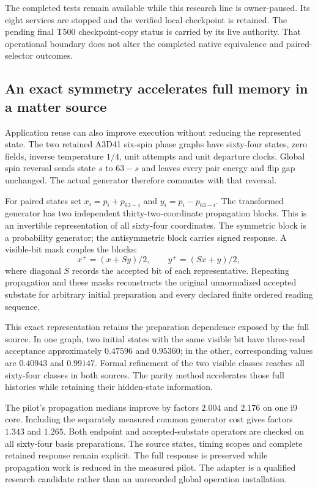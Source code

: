 The completed tests remain available while this research line is owner-paused. Its eight services are stopped and the verified local checkpoint is retained. The pending final T500 checkpoint-copy status is carried by its live authority. That operational boundary does not alter the completed native equivalence and paired-selector outcomes.

\subsection{An exact symmetry accelerates full memory in a matter source}

Application reuse can also improve execution without reducing the represented state. The two retained A3D41 six-spin phase graphs have sixty-four states, zero fields, inverse temperature $1/4$, unit attempts and unit departure clocks. Global spin reversal sends state $s$ to $63-s$ and leaves every pair energy and flip gap unchanged. The actual generator therefore commutes with that reversal. 

For paired states set $x_i=p_i+p_{63-i}$ and $y_i=p_i-p_{63-i}$. The transformed generator has two independent thirty-two-coordinate propagation blocks. This is an invertible representation of all sixty-four coordinates. The symmetric block is a probability generator; the antisymmetric block carries signed response. A visible-bit mask couples the blocks:
\[
 x^+=(x+Sy)/2,\qquad y^+=(Sx+y)/2,
\]
where diagonal $S$ records the accepted bit of each representative. Repeating propagation and these masks reconstructs the original unnormalized accepted substate for arbitrary initial preparation and every declared finite ordered reading sequence.

This exact representation retains the preparation dependence exposed by the full source. In one graph, two initial states with the same visible bit have three-read acceptance approximately $0.47596$ and $0.95360$; in the other, corresponding values are $0.40943$ and $0.99147$. Formal refinement of the two visible classes reaches all sixty-four classes in both sources. The parity method accelerates those full histories while retaining their hidden-state information.

The pilot's propagation medians improve by factors $2.004$ and $2.176$ on one i9 core. Including the separately measured common generator cost gives factors $1.343$ and $1.265$. Both endpoint and accepted-substate operators are checked on all sixty-four basis preparations. The source states, timing scopes and complete retained response remain explicit. The full response is preserved while propagation work is reduced in the measured pilot. The adapter is a qualified research candidate rather than an unrecorded global operation installation.


